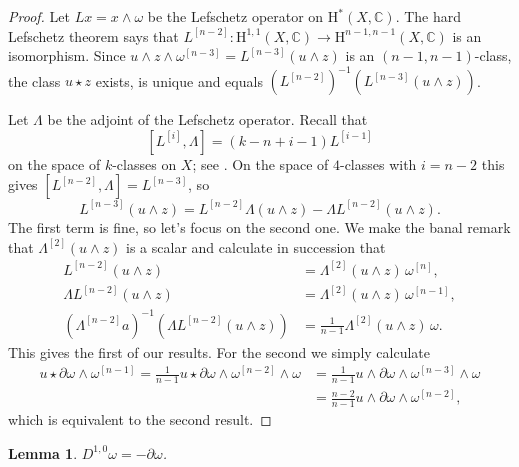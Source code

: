 \documentclass[11pt,a4paper]{amsart}
\newtheorem{lemm}[theo]{Lemma}
\theoremstyle{definition}
\theoremstyle{remark}
\newcommand{\CC}{\mathbb{C}}
\def\d{\partial}
\def\coho#1{\mathrm{H}^{#1}}
\def\chern{D}
\def\kf{\omega}
\def\ton{u}
\def\tth{z}
\def\^#1{^{[#1]}}
\begin{document}
\begin{proof}
Let $L x = x \wedge \kf$ be the Lefschetz operator on $\coho{*}(X,\CC)$.
The hard Lefschetz theorem says that $L\^{n-2} : \coho{1,1}(X,\CC) \to
\coho{n-1,n-1}(X,\CC)$ is an isomorphism. Since $\ton \wedge \tth \wedge
\kf\^{n-3} = L\^{n-3}(\ton \wedge \tth)$ is an $(n-1,n-1)$-class, the
class $\ton \star \tth$ exists, is unique and equals
$(L\^{n-2})^{-1}(L\^{n-3}(\ton \wedge \tth))$.

Let $\Lambda$ be the adjoint of the Lefschetz operator. Recall that
$$
[L\^i, \Lambda] = (k - n + i - 1) L\^{i-1}
$$
on the space of $k$-classes on $X$; see
\cite[Corollary~1.64]{HuybrechtsGeometry}. On the space of $4$-classes
with $i = n-2$ this gives $[L\^{n-2}, \Lambda] = L\^{n-3}$, so
$$
L\^{n-3}(\ton \wedge \tth)
= L\^{n-2}\Lambda(\ton \wedge \tth) 
- \Lambda L\^{n-2}(\ton \wedge \tth).
$$
The first term is fine, so let's focus on the second one. We make the
banal remark that $\Lambda\^2(\ton \wedge \tth)$ is a scalar and
calculate in succession that
\begin{align*}
L\^{n-2}(\ton \wedge \tth) 
&= \Lambda\^{2}(\ton \wedge \tth)\, \kf\^n,
\\
\Lambda L\^{n-2}(\ton \wedge \tth) 
&= \Lambda\^{2}(\ton \wedge \tth)\, \kf\^{n-1},
\\
(\Lambda\^{n-2}a)^{-1}(\Lambda L\^{n-2}(\ton \wedge \tth) )
&= \tfrac{1}{n-1} \Lambda\^{2}(\ton \wedge \tth)\, \kf.
\end{align*}
This gives the first of our results. For the second we simply calculate
\begin{align*}
\ton \star \d\kf \wedge \kf\^{n-1}
= \frac{1}{n-1} \ton \star \d\kf \wedge \kf\^{n-2} \wedge \kf
&= \frac{1}{n-1} \ton \wedge \d\kf \wedge \kf\^{n-3} \wedge \kf
\\
&= \frac{n-2}{n-1} \ton \wedge \d\kf \wedge \kf\^{n-2},
\end{align*}
which is equivalent to the second result.
\end{proof}


\begin{lemm}
\label{coro:kahlerform}
$\chern^{1,0} \kf = -\d\kf$.
\end{lemm}
\end{document}
